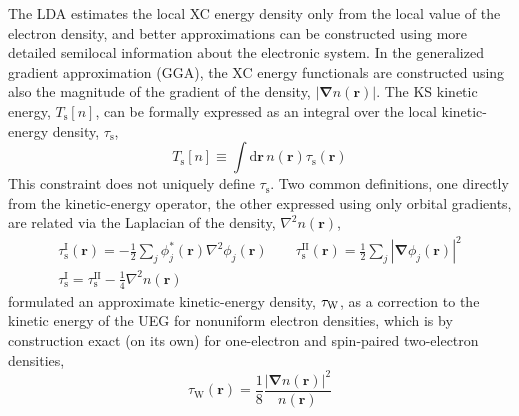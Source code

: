 The LDA estimates the local XC energy density only from the local value of the electron density, and better approximations can be constructed using more detailed semilocal information about the electronic system.
In the generalized gradient approximation (GGA), the XC energy functionals are constructed using also the magnitude of the gradient of the density, $|\boldsymbol\nabla n(\mathbf r)|$.
The KS kinetic energy, $T_\text{s}[n]$, can be formally expressed as an integral over the local kinetic-energy density, $\tau_\text{s}$,
\begin{equation}
  T_\text{s}[n]\equiv\int\mathrm d\mathbf r\,n(\mathbf r)\tau_\text{s}(\mathbf r)
\end{equation}
This constraint does not uniquely define $\tau_\text{s}$.
Two common definitions, one directly from the kinetic-energy operator, the other expressed using only orbital gradients, are related via the Laplacian of the density, $\nabla^2n(\mathbf r)$,
\begin{equation}
\begin{gathered}
  \tau_\text{s}^\text{I}(\mathbf r)=-\frac12\sum_j\phi_j^*(\mathbf r)\nabla^2\phi_j(\mathbf r)\qquad
  \tau_\text{s}^\text{II}(\mathbf r)=\frac12\sum_j|\boldsymbol\nabla\phi_j(\mathbf r)|^2 \\
  \tau_\text{s}^\text{I}=\tau_\text{s}^\text{II}-\tfrac14\nabla^2n(\mathbf r)
\end{gathered}\label{eq:kinetic}
\end{equation}
\citet{vonWeizsackerZFP35} formulated an approximate kinetic-energy density, $\tau_\text W$, as a correction to the kinetic energy of the UEG for nonuniform electron densities, which is by construction exact (on its own) for one-electron and spin-paired two-electron densities,
\begin{equation}
  \tau_\text{W}(\mathbf r)=\frac18\frac{|\boldsymbol\nabla n(\mathbf r)|^2}{n(\mathbf r)}
  \label{eq:von-w}
\end{equation}

